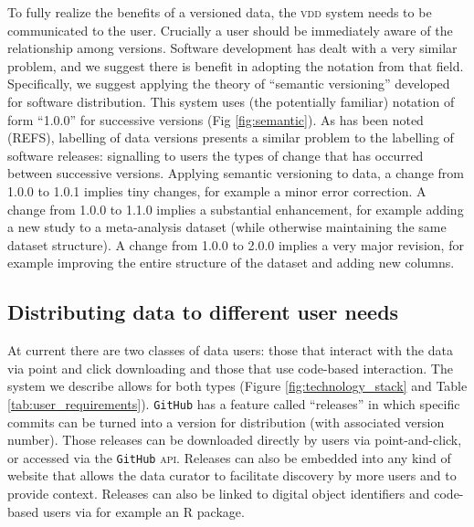 \documentclass[a4paper,11pt]{article}
\begin{document}
To fully realize the benefits of a versioned data, the \textsc{vdd} system needs to be communicated to the user.  Crucially a user should be immediately aware of the relationship among versions.  Software development has dealt with a very similar problem, and we suggest there is benefit in adopting the notation from that field.  Specifically, we suggest applying the theory of ``semantic versioning'' developed for software distribution. This system uses (the potentially familiar) notation of form ``1.0.0'' for successive versions (Fig \ref{fig:semantic}). As has been noted (REFS), labelling of data versions presents a similar problem to the labelling of software releases: signalling to users the types of change that has occurred between successive versions. Applying semantic versioning to data, a change from 1.0.0 to 1.0.1 implies tiny changes, for example a minor error correction. A change from 1.0.0 to 1.1.0 implies a substantial enhancement, for example adding a new study to a meta-analysis dataset (while otherwise maintaining the same dataset structure). A change from 1.0.0 to 2.0.0 implies a very major revision, for example improving the entire structure of the dataset and adding new columns.


\subsection{Distributing data to different user needs}

At current there are two classes of data users: those that  interact with the data via point and click downloading and those that use code-based interaction.  The system we describe allows for both types (Figure \ref{fig:technology_stack} and Table \ref{tab:user_requirements}).  \texttt{GitHub} has a feature called ``releases'' in which specific commits can be turned into a version for distribution (with associated version number).  Those releases can be downloaded directly by users via point-and-click, or accessed via the \texttt{GitHub} \textsc{api}.
Releases can also be embedded into any kind of website that allows the data curator to facilitate discovery by more users and to provide context.  Releases can also be linked to digital object identifiers and code-based users via for example an \textsc{R} package.
\end{document}

